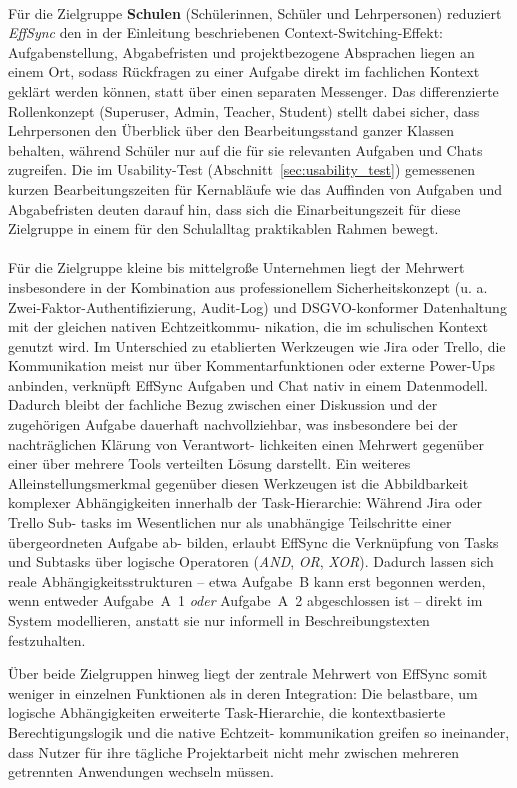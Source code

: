 \paragraph{}Für die Zielgruppe \textbf{Schulen} (Schülerinnen, Schüler und Lehrpersonen) reduziert \textit{EffSync} den in der Einleitung beschriebenen Context-Switching-Effekt: Aufgabenstellung, Abgabefristen und projektbezogene Absprachen liegen an einem Ort, sodass Rückfragen zu einer Aufgabe direkt im fachlichen Kontext geklärt werden können, statt über einen separaten Messenger. Das differenzierte Rollenkonzept (Superuser, Admin, Teacher, Student) stellt dabei sicher, dass Lehrpersonen den Überblick über den Bearbeitungsstand ganzer Klassen behalten, während Schüler nur auf die für sie relevanten Aufgaben und Chats zugreifen. Die im Usability-Test (Abschnitt~\ref{sec:usability_test}) gemessenen kurzen Bearbeitungszeiten für Kernabläufe wie das Auffinden von Aufgaben und Abgabefristen deuten darauf hin, dass sich die Einarbeitungszeit für diese Zielgruppe in einem für den Schulalltag praktikablen Rahmen bewegt.

\paragraph{}Für die Zielgruppe kleine bis mittelgroße Unternehmen liegt der Mehrwert insbesondere
in der Kombination aus professionellem Sicherheitskonzept (u. a. Zwei-Faktor-Authentifizierung,
Audit-Log) und DSGVO-konformer Datenhaltung mit der gleichen nativen Echtzeitkommu-
nikation, die im schulischen Kontext genutzt wird. Im Unterschied zu etablierten Werkzeugen
wie Jira oder Trello, die Kommunikation meist nur über Kommentarfunktionen oder externe
Power-Ups anbinden, verknüpft EffSync Aufgaben und Chat nativ in einem Datenmodell.
Dadurch bleibt der fachliche Bezug zwischen einer Diskussion und der zugehörigen Aufgabe
dauerhaft nachvollziehbar, was insbesondere bei der nachträglichen Klärung von Verantwort-
lichkeiten einen Mehrwert gegenüber einer über mehrere Tools verteilten Lösung darstellt.
Ein weiteres Alleinstellungsmerkmal gegenüber diesen Werkzeugen ist die Abbildbarkeit
komplexer Abhängigkeiten innerhalb der Task-Hierarchie: Während Jira oder Trello Sub-
tasks im Wesentlichen nur als unabhängige Teilschritte einer übergeordneten Aufgabe ab-
bilden, erlaubt EffSync die Verknüpfung von Tasks und Subtasks über logische Operatoren
(\textit{AND}, \textit{OR}, \textit{XOR}). Dadurch lassen sich reale Abhängigkeitsstrukturen --
etwa \glqq{}Aufgabe~B kann erst begonnen werden, wenn entweder Aufgabe~A~1 \textit{oder}
Aufgabe~A~2 abgeschlossen ist\grqq{} -- direkt im System modellieren, anstatt sie nur informell
in Beschreibungstexten festzuhalten.

Über beide Zielgruppen hinweg liegt der zentrale Mehrwert von EffSync somit weniger in
einzelnen Funktionen als in deren Integration: Die belastbare, um logische Abhängigkeiten
erweiterte Task-Hierarchie, die kontextbasierte Berechtigungslogik und die native Echtzeit-
kommunikation greifen so ineinander, dass Nutzer für ihre tägliche Projektarbeit nicht mehr
zwischen mehreren getrennten Anwendungen wechseln müssen.